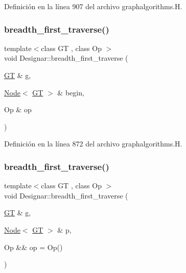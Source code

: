 Definición en la línea 907 del archivo graphalgorithms.\+H.

\mbox{\label{namespace_designar_a676f3fbced360c84028f69998e74bede}} 
\subsubsection{\texorpdfstring{breadth\+\_\+first\+\_\+traverse()}{breadth\_first\_traverse()}\hspace{0.1cm}{\footnotesize\ttfamily [1/4]}}
{\footnotesize\ttfamily template$<$class GT , class Op $>$ \\
void Designar\+::breadth\+\_\+first\+\_\+traverse (\begin{DoxyParamCaption}\item[{\hyperlink{demo-buildgraph_8_c_a3001c40d2c31ca87ed96cd7d1334a55e}{GT} \&}]{g,  }\item[{\hyperlink{namespace_designar_a5af326c65aa2bd26b26c410f2030d09e}{Node}$<$ \hyperlink{demo-buildgraph_8_c_a3001c40d2c31ca87ed96cd7d1334a55e}{GT} $>$ \&}]{begin,  }\item[{Op \&}]{op }\end{DoxyParamCaption})}



Definición en la línea 872 del archivo graphalgorithms.\+H.

\mbox{\label{namespace_designar_acbf0c7fd2a8cd448777c1d9ee9500e25}} 
\subsubsection{\texorpdfstring{breadth\+\_\+first\+\_\+traverse()}{breadth\_first\_traverse()}\hspace{0.1cm}{\footnotesize\ttfamily [2/4]}}
{\footnotesize\ttfamily template$<$class GT , class Op $>$ \\
void Designar\+::breadth\+\_\+first\+\_\+traverse (\begin{DoxyParamCaption}\item[{\hyperlink{demo-buildgraph_8_c_a3001c40d2c31ca87ed96cd7d1334a55e}{GT} \&}]{g,  }\item[{\hyperlink{namespace_designar_a5af326c65aa2bd26b26c410f2030d09e}{Node}$<$ \hyperlink{demo-buildgraph_8_c_a3001c40d2c31ca87ed96cd7d1334a55e}{GT} $>$ \&}]{p,  }\item[{Op \&\&}]{op = {\ttfamily Op()} }\end{DoxyParamCaption})}



